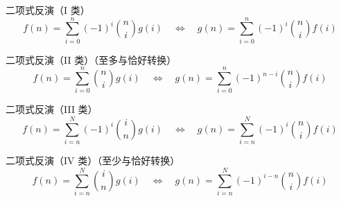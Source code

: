 二项式反演（I 类）
\[
f(n) = \sum_{i=0}^{n} (-1)^i \binom{n}{i} g(i) \quad\Longleftrightarrow\quad 
g(n) = \sum_{i=0}^{n} (-1)^i \binom{n}{i} f(i)
\]

二项式反演（II 类）（至多与恰好转换）
\[
f(n) = \sum_{i=0}^{n} \binom{n}{i} g(i) \quad\Longleftrightarrow\quad 
g(n) = \sum_{i=0}^{n} (-1)^{n-i} \binom{n}{i} f(i)
\]

二项式反演（III 类）
\[
f(n) = \sum_{i=n}^{N} (-1)^i \binom{i}{n} g(i) \quad\Longleftrightarrow\quad 
g(n) = \sum_{i=n}^{N} (-1)^i \binom{n}{i} f(i)
\]

二项式反演（IV 类）（至少与恰好转换）
\[
f(n) = \sum_{i=n}^{N} \binom{i}{n} g(i) \quad\Longleftrightarrow\quad 
g(n) = \sum_{i=n}^{N} (-1)^{i-n} \binom{n}{i} f(i)
\]
